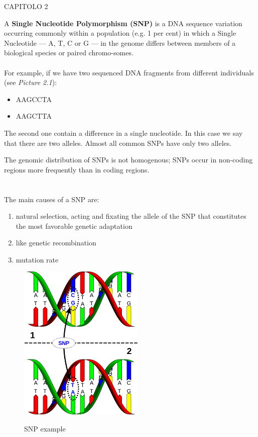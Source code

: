 CAPITOLO 2










A \textbf{Single Nucleotide Polymorphism (SNP)} is a DNA sequence variation occurring commonly within a population (e.g. 1 per cent) in which a Single Nucleotide — A, T, C or G — in the genome differs between members of a biological species or paired chromo-somes. 
\\
\\For example, if we have two sequenced DNA fragments from different individuals (see \emph{Picture 2.1}):

\begin{itemize}
	\item AAGCCTA
	\item AAGCTTA
\end{itemize}

The second one contain a difference in a single nucleotide. In this case we say that there are two alleles. Almost all common SNPs have only two alleles. 

The genomic distribution of SNPs is not homogenous; SNPs occur in non-coding regions more frequently than in coding regions.
\\
\\
\\The main causes of a SNP are:

\begin{enumerate}
	\item natural selection, acting and fixating the allele of the SNP that constitutes the most favorable genetic adaptation
	\item like genetic recombination
	\item mutation rate
	\end{enumerate}

\begin{figure}[ht!]
	\centering
	\includegraphics[width=60mm]{../Images/SNP_example.png}
	\label{overflow}
	\caption{SNP example}
	\end{figure}

